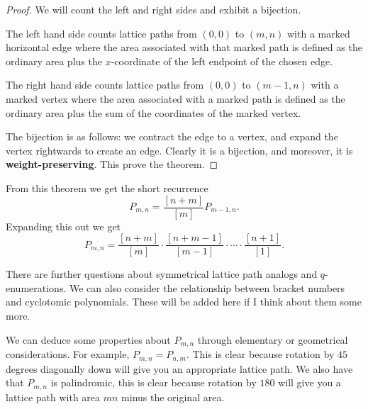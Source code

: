 \begin{proof}
We will count the left and right sides and exhibit a bijection.

The left hand side counts lattice paths from $(0, 0)$ to $(m, n)$ with a marked horizontal edge where the area associated with that marked path is defined as the ordinary area plus the $x$-coordinate of the left endpoint of the chosen edge. 

The right hand side counts lattice paths from $(0, 0)$ to $(m-1, n)$ with a marked vertex where the area associated with a marked path is defined as the ordinary area plus the sum of the coordinates of the marked vertex.

The bijection is as follows: we contract the edge to a vertex, and expand the vertex rightwards to create an edge. Clearly it is a bijection, and moreover, it is \textbf{weight-preserving}. This prove the theorem.
\end{proof}

From this theorem we get the short recurrence 
\[P_{m, n} = \frac{[n + m]}{[m]}P_{m-1, n}.\] Expanding this out we get
\[P_{m, n} = \frac{[n + m]}{[m]}\cdot\frac{[n + m - 1]}{[m-1]} \cdot \cdots \cdot \frac{[n + 1]}{[1]}.\]

There are further questions about symmetrical lattice path analogs and $q$-enumerations. We can also consider the relationship between bracket numbers and cyclotomic polynomials. These will be added here if I think about them some more.

We can deduce some properties about $P_{m, n}$ through elementary or geometrical considerations. For example, $P_{m, n} = P_{n, m}$. This is clear because rotation by $45$ degrees diagonally down will give you an appropriate lattice path. We also have that $P_{m, n}$ is palindromic, this is clear because rotation by $180$ will give you a lattice path with area $mn$ minus the original area.